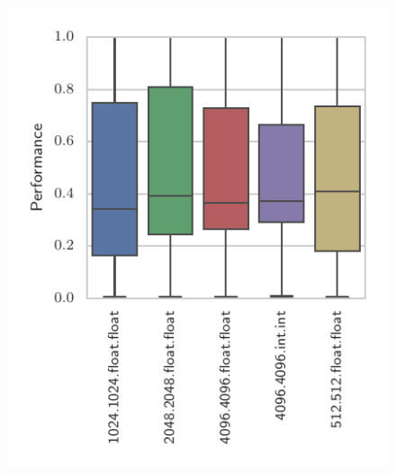 ~%
\begin{subfigure}[h]{.48\textwidth}
\centering
\includegraphics{img/performance_datasets.pdf}
\vspace{-1.5em} %
\caption{}
\label{fig:performance-datasets}
\end{subfigure}
